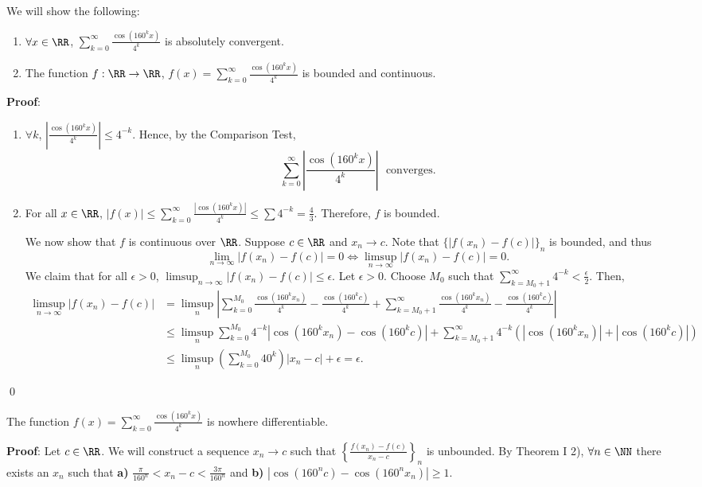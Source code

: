 \begin{theorem}
We will show the following: 
\begin{enumerate}
\item $\forall x\in \RR$, $\sum_{k=0}^\infty \frac{\cos(160^k x)}{4^k}$ is absolutely convergent.
\item The function $f:\RR \to \RR$, $f(x) = \sum_{k=0}^\infty \frac{\cos(160^k x)}{4^k}$ is bounded and continuous.
\end{enumerate}
\end{theorem}
\textbf{Proof}:
\begin{enumerate}
    \item $\forall k$, $\left| \frac{\cos(160^k x)}{4^k}\right|\leq 4^{-k}$. Hence, by the Comparison Test, 
    \[\sum_{k=0}^\infty \left|\frac{\cos(160^k x)}{4^k}\right| \text{~~converges.}\]
    \item For all $x\in \RR$, $|f(x)| \leq \sum_{k=0}^\infty \frac{|\cos(160^k x)|}{4^k} \leq \sum 4^{-k} = \frac{4}{3}$. Therefore, $f$ is bounded. 
    
    We now show that $f$ is continuous over $\RR$. Suppose $c\in \RR$ and $x_n\to c$. Note that $\{|f(x_n) - f(c)|\}_n$ is bounded, and thus 
    \[
    \lim_{n\to \infty} |f(x_n) - f(c)| = 0 \iff \limsup_{n\to \infty} |f(x_n)-f(c)| = 0.
    \]
    We claim that for all $\epsilon>0$, $\limsup_{n\to \infty} |f(x_n)-f(c)|\leq \epsilon$. Let $\epsilon>0$. Choose $M_0$ such that $\sum_{k=M_0 + 1}^\infty 4^{-k} < \frac{\epsilon}{2}$. Then,
    \begin{align*}
        \limsup_{n\to \infty} |f(x_n) -f(c)| &= \limsup_n \left|\sum_{k=0}^{M_0} \frac{\cos(160^k x_n)}{4^k} - \frac{\cos(160^k c)}{4^k} + \sum_{k=M_0+1}^{\infty} \frac{\cos(160^k x_n)}{4^k} - \frac{\cos(160^k c)}{4^k}\right| \\
        &\leq \limsup_n \sum_{k=0}^{M_0} 4^{-k} |\cos(160^k x_n)-\cos(160^k c)| + \sum_{k=M_0+1}^\infty 4^{-k} (|\cos(160^k x_n)| + |\cos(160^k c)|) \\
        &\leq \limsup_{n} \left(\sum_{k=0}^{M_0} 40^k\right)|x_n-c| + \epsilon = \epsilon.
    \end{align*}
\end{enumerate} \qed 

\begin{theorem}[Weierstrass]
The function $f(x) = \sum_{k=0}^\infty \frac{\cos(160^k x)}{4^k}$
is nowhere differentiable.
\end{theorem}
\textbf{Proof}: Let $c\in \RR$. We will construct a sequence $x_n\to c$ such that $\left\{\frac{f(x_n) - f(c)}{x_n - c}\right\}_n$ is unbounded. By Theorem I 2), $\forall n\in \NN$ there exists an $x_n$ such that \textbf{a)} $\frac{\pi}{160^n} < x_n - c < \frac{3\pi}{160^n}$ and \textbf{b)} $|\cos(160^n c) - \cos(160^n x_n)| \geq 1$.

